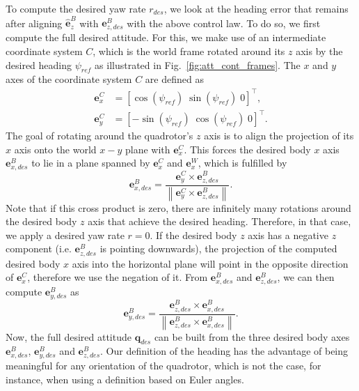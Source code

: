 \documentclass[10pt,a4paper,fleqn]{article}
\newcommand{\yawRef}{\ensuremath{\psi_{ref}}}
\newcommand{\bVec}[1]{\mathbf{#1}}
\newcommand{\norm}[1]{\left\lVert#1\right\rVert}
\newcommand{\wfr}[0]{\ensuremath{W}} %
\newcommand{\bfr}[0]{\ensuremath{B}} %
\begin{document}
To compute the desired yaw rate $r_{des}$, we look at the heading error that remains after aligning $\hat{\bVec{e}}_{z}^{\bfr}$ with $\bVec{e}_{z,des}^{\bfr}$ with the above control law.
To do so, we first compute the full desired attitude.
For this, we make use of an intermediate coordinate system $C$, which is the world frame rotated around its $z$ axis by the desired heading $\yawRef$ as illustrated in Fig.~\ref{fig:att_cont_frames}.
The $x$ and $y$ axes of the coordinate system $C$ are defined as
%
\begin{align}
	\bVec{e}_{x}^{C} &= [\cos(\yawRef) \; \sin(\yawRef) \; 0]^{\top}, \\
	\bVec{e}_{y}^{C} &= [-\sin(\yawRef) \; \cos(\yawRef) \; 0]^{\top}.
\end{align}
%
The goal of rotating around the quadrotor's $z$ axis is to align the projection of its $x$ axis onto the world $x-y$ plane with $\bVec{e}_{x}^{C}$.
This forces the desired body $x$ axis $\bVec{e}_{x,des}^{\bfr}$ to lie in a plane spanned by $\bVec{e}_{x}^{C}$ and $\bVec{e}_{x}^{\wfr}$, which is fulfilled by
%
\begin{equation}
	\bVec{e}_{x,des}^{\bfr} = \frac{\bVec{e}_{y}^{C} \times \bVec{e}_{z,des}^{\bfr}}
								{\norm{\bVec{e}_{y}^{C} \times \bVec{e}_{z,des}^{\bfr}}}.
\end{equation}
%
Note that if this cross product is zero, there are infinitely many rotations around the desired body $z$ axis that achieve the desired heading.
Therefore, in that case, we apply a desired yaw rate $r = 0$.
\newline\newline
If the desired body $z$ axis has a negative $z$ component (i.e. $\bVec{e}_{z,des}^{\bfr}$ is pointing downwards), the projection of the computed desired body $x$ axis into the horizontal plane will point in the opposite direction of $\bVec{e}_{x}^{C}$, therefore we use the negation of it.
From $\bVec{e}_{x,des}^{\bfr}$ and $\bVec{e}_{z,des}^{\bfr}$, we can then compute $\bVec{e}_{y,des}^{\bfr}$ as
%
\begin{equation}
	\bVec{e}_{y,des}^{\bfr} = \frac{\bVec{e}_{z,des}^{\bfr} \times \bVec{e}_{x,des}^{\bfr}}
								{\norm{\bVec{e}_{z,des}^{\bfr} \times \bVec{e}_{x,des}^{\bfr}}}.
\end{equation}
%
Now, the full desired attitude $\bVec{q}_{des}$ can be built from the three desired body axes $\bVec{e}_{x,des}^{\bfr}$, $\bVec{e}_{y,des}^{\bfr}$ and $\bVec{e}_{z,des}^{\bfr}$.
Our definition of the heading has the advantage of being meaningful for any orientation of the quadrotor, which is not the case, for instance, when using a definition based on Euler angles.
\end{document}
